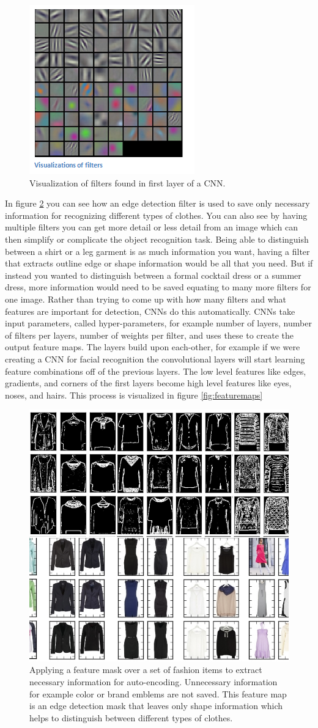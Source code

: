\begin{figure}[htp!]
\centering
\includegraphics[width=.25\textwidth]{figs/conv1vis.png}
\caption{Visualization of filters found in first layer of a CNN.}
\label{fig:curvedetector}
\end{figure} 

In figure \ref{fig:convolution} you can see how an edge detection filter is used to save only necessary information for recognizing different types of clothes. You can also see by having multiple filters you can get more detail or less detail from an image which can then simplify or complicate the object recognition task. Being able to distinguish between a shirt or a leg garment is as much information you want, having a filter that extracts outline edge or shape information would be all that you need. But if instead you wanted to distinguish between a formal cocktail dress or a summer dress, more information would need to be saved equating to many more filters for one image. Rather than trying to come up with how many filters and what features are important for detection, CNNs do this automatically. CNNs take input parameters, called hyper-parameters, for example number of layers, number of filters per layers, number of weights per filter, and uses these to create the output feature maps. The layers build upon each-other, for example if we were creating a CNN for facial recognition the convolutional layers will start learning feature combinations off of the previous layers. The low level features like edges, gradients, and corners of the first layers become high level features like eyes, noses, and hairs. This process is visualized in figure \ref{fig:featuremaps} 

\begin{figure}[t!]
\centering
\includegraphics[width=.48\linewidth]{figs/convolution.png}
\caption{Applying a feature mask over a set of fashion items to extract necessary information for auto-encoding. Unnecessary information for example color or brand emblems are not saved. This feature map is an edge detection mask that leaves only shape information which helps to distinguish between different types of clothes.} 
\label{fig:convolution}
\end{figure}

